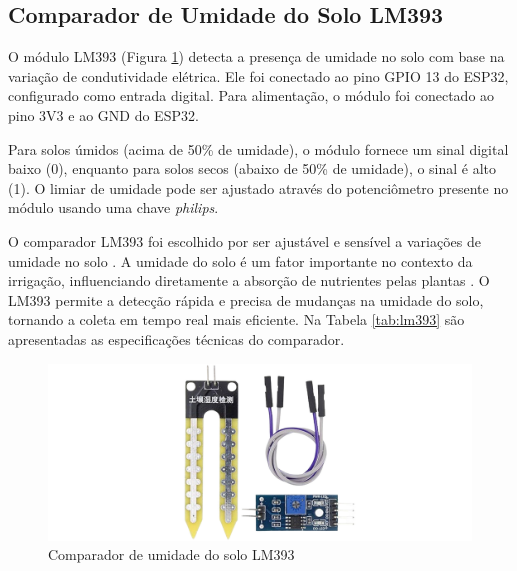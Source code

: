 \subsection{Comparador de Umidade do Solo LM393}

O módulo LM393 (Figura \ref{figura:lm393}) detecta a presença de umidade no solo com base na variação de condutividade elétrica. Ele foi conectado ao pino GPIO 13 do ESP32, configurado como entrada digital. Para alimentação, o módulo foi conectado ao pino 3V3 e ao GND do ESP32.

Para solos úmidos (acima de 50\% de umidade), o módulo fornece um sinal digital baixo (0), enquanto para solos secos (abaixo de 50\% de umidade), o sinal é alto (1). O limiar de umidade pode ser ajustado através do potenciômetro presente no módulo usando uma chave \textit{philips}.

O comparador LM393 foi escolhido por ser ajustável e sensível a variações de umidade no solo \parencite{LM393}. A umidade do solo é um fator importante no contexto da irrigação, influenciando diretamente a absorção de nutrientes pelas plantas \parencite{Zhang_evapotranspiration_med2016}. O LM393 permite a detecção rápida e precisa de mudanças na umidade do solo, tornando a coleta em tempo real mais eficiente. Na Tabela \ref{tab:lm393} são apresentadas as especificações técnicas do comparador.

\begin{figure}[!htb] \centering
  \caption{Comparador de umidade do solo LM393} \label{figura:lm393}
  \begin{varwidth}{\linewidth}
    \includegraphics[width=16cm]{figuras/LM393.png}
  \end{varwidth}
\end{figure}

